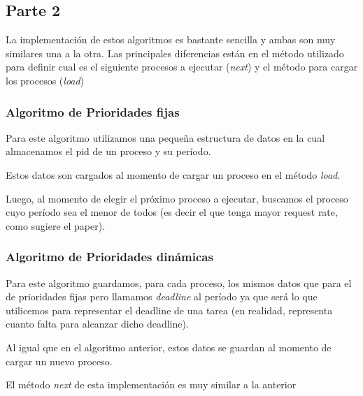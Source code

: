 \documentclass[a4paper,11pt]{article}
\begin{document}
	
\subsection{Parte 2}
	La implementación de estos algoritmos es bastante sencilla y ambas son muy similares una a la otra. Las principales diferencias están en el método utilizado para definir cual es el siguiente procesos a ejecutar (\emph{next}) y el método para cargar los procesos (\emph{load})

\pagebreak

	\subsubsection{Algoritmo de Prioridades fijas}
	Para este algoritmo utilizamos una pequeña estructura de datos en la cual almacenamos el pid de un proceso y su período.
	
	


	Estos datos son cargados al momento de cargar un proceso en el método \emph{load}.
	

	Luego, al momento de elegir el próximo proceso a ejecutar, buscamos el proceso cuyo período sea el menor de todos (es decir el que tenga mayor request rate, como sugiere el paper).
	

\pagebreak

	\subsubsection{Algoritmo de Prioridades dinámicas}
	Para este algoritmo guardamos, para cada proceso, los mismos datos que para el de prioridades fijas pero llamamos \textit{deadline} al período ya que será lo que utilicemos para representar el deadline de una tarea (en realidad, representa cuanto falta para alcanzar dicho deadline).
	

	Al igual que en el algoritmo anterior, estos datos se guardan al momento de cargar un nuevo proceso.
	

	El método \emph{next} de esta implementación es muy similar a la anterior
	
	
\end{document}
